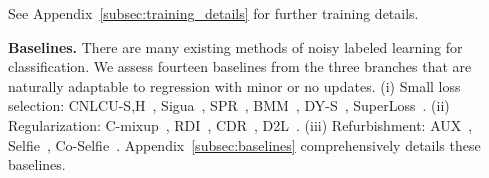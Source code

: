 \documentclass{article}
\theoremstyle{plain}
\theoremstyle{definition}
\theoremstyle{remark}
\begin{document}
See Appendix~\ref{subsec:training_details} for further training details.


\textbf{Baselines.} There are many existing methods of noisy labeled learning for classification. 
We assess fourteen baselines from the three branches that are naturally adaptable to regression with minor or no updates. %
(i) Small loss selection: CNLCU-S,H~\citep{xia22}, Sigua~\citep{han20sigua}, SPR~\citep{wang22spr}, BMM~\citep{arazo19}, DY-S~\citep{arazo19}, SuperLoss~\citep{castells20}.
(ii) Regularization: C-mixup~\citep{yao22cmixup}, RDI~\citep{hu20rdiaux}, CDR~\citep{xia21cdr}, D2L~\citep{ma18d2l}.
(iii) Refurbishment: AUX~\citep{hu20rdiaux}, Selfie~\citep{song19b}, Co-Selfie~\citep{song19b}.
Appendix~\ref{subsec:baselines} comprehensively details these baselines.
\end{document}
